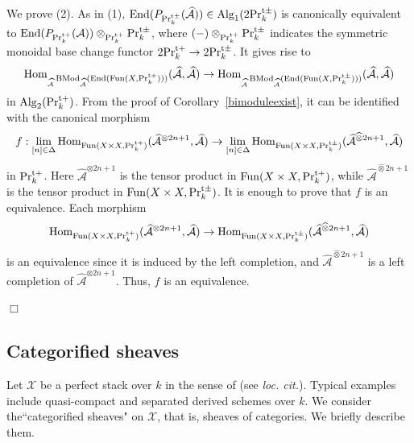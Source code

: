 \documentclass[leqno,12pt]{amsart}
\theoremstyle{plain}
\theoremstyle{definition}
\newcommand{\AAA}{\mathcal{A}}
\newcommand{\PRTT}{\textup{Pr}^{\textup{t}+}}
\newcommand{\PRTTT}{\textup{Pr}^{\textup{t}\pm}}
\newcommand{\Hom}{\operatorname{Hom}}
\newcommand{\Fun}{\operatorname{Fun}}
\newcommand{\Alg}{\operatorname{Alg}}
\newcommand{\End}{\operatorname{End}}
\newcommand{\XX}{\mathcal{X}}
\newcommand{\BMod}{\operatorname{BMod}}
\newcommand{\QED}{{\unskip\nobreak\hfil\penalty50\quad\null\nobreak\hfil
{$\Box$}\parfillskip0pt\finalhyphendemerits0\par\medskip}}
\begin{document}
We prove (2).
As in (1),
$\End(P_{\PRTTT_k}(\widehat{\AAA}))\in \Alg_1(2\PRTTT_k)$
is canonically equivalent to $\End(P_{\PRTT_k}(\AAA))\otimes_{\PRTT_k}\PRTTT_k$, where 
$(-)\otimes_{\PRTT_k}\PRTTT_k$ indicates the symmetric monoidal base change functor $2\PRTT_k\to 2\PRTTT_k$.
It gives rise to 
\[
\Hom_{{}_{\widehat{\mathcal{A}}}\BMod_{\widehat{\mathcal{A}}}(\End(\Fun(X,\PRTT_k)))}(\widehat{\mathcal{A}},\widehat{\mathcal{A}})\to \Hom_{{}_{\widehat{\mathcal{A}}}\BMod_{\widehat{\mathcal{A}}}(\End(\Fun(X,\PRTTT_k)))}(\widehat{\mathcal{A}},\widehat{\mathcal{A}})
\]
in $\Alg_2(\PRTT_k)$.
From the proof of Corollary~\ref{bimoduleexist}, it can be identified with the canonical morphism
\[
f:\lim_{[n]\in \Delta}\Hom_{\Fun(X\times X,\PRTT_k)}( \widehat{\mathcal{A}}^{\otimes 2n+1},\widehat{\mathcal{A}})\to \lim_{[n]\in \Delta}\Hom_{\Fun(X\times X,\PRTTT_k)}( \widehat{\mathcal{A}}^{\widehat{\otimes} 2n+1},\widehat{\mathcal{A}})
\]
in $\PRTT_k$. Here $\widehat{\mathcal{A}}^{\otimes 2n+1}$ is the tensor product in $\Fun(X\times X,\PRTT_k)$, while
$\widehat{\mathcal{A}}^{\widehat{\otimes} 2n+1}$ is the tensor product in $\Fun(X\times X,\PRTTT_k)$.
It is enough to prove that $f$ is an equivalence.
Each morphism
\[
\Hom_{\Fun(X\times X,\PRTT_k)}( \widehat{\mathcal{A}}^{\otimes 2n+1},\widehat{\mathcal{A}})\to \Hom_{\Fun(X\times X,\PRTTT_k)}( \widehat{\mathcal{A}}^{\widehat{\otimes} 2n+1},\widehat{\mathcal{A}})
\]
is an equivalence since it is induced by the left completion, and 
$\widehat{\mathcal{A}}^{\widehat{\otimes} 2n+1}$ is a left completion of $\widehat{\mathcal{A}}^{\otimes 2n+1}$.
Thus, $f$ is an equivalence. 
\QED









\subsection{Categorified sheaves}


\label{catsheaves}


Let $\XX$ be a perfect stack over $k$ in the sense of \cite{BFN} (see {\it loc. cit.}).
Typical examples include quasi-compact and separated derived schemes over $k$.
We consider the``categorified sheaves" on $\XX$, that is, sheaves of categories.
We briefly describe them.
\end{document}
